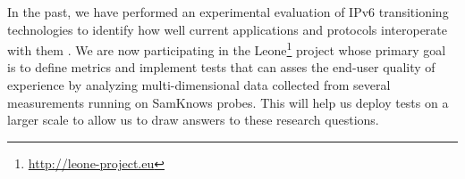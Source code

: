 In the past, we have performed an experimental evaluation of IPv6
transitioning technologies to identify how well current applications and
protocols interoperate with them \cite{vbajpai:2012}. We are now participating
in the Leone\footnote{\url{http://leone-project.eu}} project whose primary
goal is to define metrics and implement tests that can asses the end-user
quality of experience by analyzing multi-dimensional data collected from
several measurements running on SamKnows probes. This will help us deploy
tests on a larger scale to allow us to draw answers to these research
questions.
